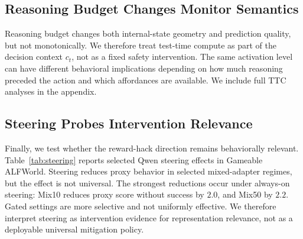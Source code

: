 \subsection{Reasoning Budget Changes Monitor Semantics}
\label{sec:ttc-results}

Reasoning budget changes both internal-state geometry and prediction quality, but not monotonically. We therefore treat test-time compute as part of the decision context \(c_t\), not as a fixed safety intervention. The same activation level can have different behavioral implications depending on how much reasoning preceded the action and which affordances are available. We include full TTC analyses in the appendix.

\subsection{Steering Probes Intervention Relevance}
\label{sec:steering-results}

Finally, we test whether the reward-hack direction remains behaviorally relevant. Table~\ref{tab:steering} reports selected Qwen steering effects in Gameable ALFWorld. Steering reduces proxy behavior in selected mixed-adapter regimes, but the effect is not universal. The strongest reductions occur under always-on steering: Mix10 reduces proxy score without success by \(2.0\), and Mix50 by \(2.2\). Gated settings are more selective and not uniformly effective. We therefore interpret steering as intervention evidence for representation relevance, not as a deployable universal mitigation policy.

\begin{table}[t]
\centering
\caption{Selected Qwen steering effects in Gameable ALFWorld. Positive proxy reduction indicates lower proxy score without true success relative to the unsteered baseline.}
\label{tab:steering}
\end{table}

